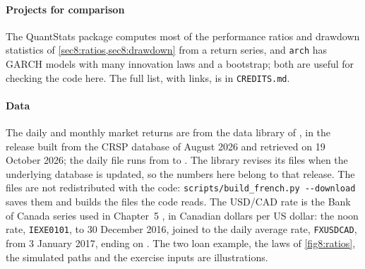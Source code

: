 \begin{chapterrefs}
\paragraph{Projects for comparison}
The QuantStats package \parencite{quantstats} computes most of the performance ratios and drawdown statistics of
\cref{sec8:ratios,sec8:drawdown} from a return series, and \texttt{arch} has GARCH models with many
innovation laws and a bootstrap; both are useful for checking the code here. The full list, with
links, is in \texttt{CREDITS.md}.

\paragraph{Data}
The daily and monthly market returns are from the data library of \textcite{frenchlib}, in the release
built from the CRSP database of August 2026 and retrieved on 19 October 2026; the daily file runs from
\tdFirst{} to \tdLast. The library revises its files when the underlying database is updated, so the numbers here
belong to that release. The files are not redistributed with the code:
\texttt{scripts/build\_french.py -{}-download} saves them and builds the files the code reads. The
USD/CAD rate is the Bank of Canada series used in Chapter~5 \parencite{bocfx}, in Canadian dollars per US
dollar: the noon rate, \texttt{IEXE0101}, to 30 December 2016, joined to the daily average rate,
\texttt{FXUSDCAD}, from 3 January 2017, ending on \cyLast. The two loan example, the laws of \cref{fig8:ratios}, the simulated paths and the exercise
inputs are illustrations.

\end{chapterrefs}
\flushbottom
